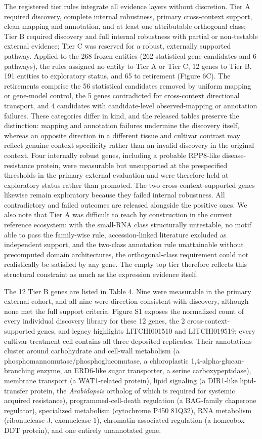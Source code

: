 \documentclass[12pt,letterpaper]{article}
\begin{document}
The registered tier rules integrate all evidence layers without discretion. Tier A required discovery, complete internal robustness, primary cross-context support, clean mapping and annotation, and at least one attributable orthogonal class; Tier B required discovery and full internal robustness with partial or non-testable external evidence; Tier C was reserved for a robust, externally supported pathway. Applied to the 268 frozen entities (262 statistical gene candidates and 6 pathways), the rules assigned no entity to Tier A or Tier C, 12 genes to Tier B, 191 entities to exploratory status, and 65 to retirement (Figure 6C). The retirements comprise the 56 statistical candidates removed by uniform mapping or gene-model control, the 5 genes contradicted for cross-context directional transport, and 4 candidates with candidate-level observed-mapping or annotation failures. These categories differ in kind, and the released tables preserve the distinction: mapping and annotation failures undermine the discovery itself, whereas an opposite direction in a different tissue and cultivar contrast may reflect genuine context specificity rather than an invalid discovery in the original context. Four internally robust genes, including a probable RPP8-like disease-resistance protein, were measurable but unsupported at the prespecified thresholds in the primary external evaluation and were therefore held at exploratory status rather than promoted. The two cross-context-supported genes likewise remain exploratory because they failed internal robustness. All contradictory and failed outcomes are released alongside the positive ones. We also note that Tier A was difficult to reach by construction in the current reference ecosystem: with the small-RNA class structurally untestable, no motif able to pass the family-wise rule, accession-linked literature excluded as independent support, and the two-class annotation rule unattainable without precomputed domain architectures, the orthogonal-class requirement could not realistically be satisfied by any gene. The empty top tier therefore reflects this structural constraint as much as the expression evidence itself.

The 12 Tier B genes are listed in Table 4. Nine were measurable in the primary external cohort, and all nine were direction-consistent with discovery, although none met the full support criteria. Figure S1 exposes the normalized count of every individual discovery library for these 12 genes, the 2 cross-context-supported genes, and legacy highlights LITCHI001510 and LITCHI019519; every cultivar-treatment cell contains all three deposited replicates. Their annotations cluster around carbohydrate and cell-wall metabolism (a phosphomannomutase/phosphoglucomutase, a chloroplastic 1,4-alpha-glucan-branching enzyme, an ERD6-like sugar transporter, a serine carboxypeptidase), membrane transport (a WAT1-related protein), lipid signaling (a DIR1-like lipid-transfer protein, the \textit{Arabidopsis} ortholog of which is required for systemic acquired resistance), programmed-cell-death regulation (a BAG-family chaperone regulator), specialized metabolism (cytochrome P450 81Q32), RNA metabolism (ribonuclease J, exonuclease 1), chromatin-associated regulation (a homeobox-DDT protein), and one entirely unannotated gene.
\end{document}
